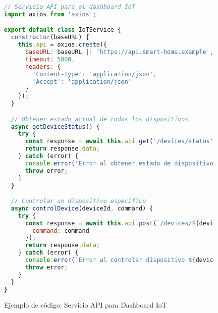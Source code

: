 
\newcommand{\CodeListing}[4]{
  \begin{figure}[H]
    \centering
    \begin{minipage}{0.95\textwidth}
      
    \end{minipage}
    \caption*{Listado de código: #2}
  \end{figure}
}

\begin{figure}[H]
  \centering
  \begin{minipage}{0.95\textwidth}
    \begin{lstlisting}[language=JavaScript, caption={Servicio de API para dashboard IoT}, label=lst:api-service]
// Servicio API para el dashboard IoT
import axios from 'axios';

export default class IoTService {
  constructor(baseURL) {
    this.api = axios.create({
      baseURL: baseURL || 'https://api.smart-home.example',
      timeout: 5000,
      headers: {
        'Content-Type': 'application/json',
        'Accept': 'application/json'
      }
    });
  }

  // Obtener estado actual de todos los dispositivos
  async getDeviceStatus() {
    try {
      const response = await this.api.get('/devices/status');
      return response.data;
    } catch (error) {
      console.error('Error al obtener estado de dispositivos:', error);
      throw error;
    }
  }

  // Controlar un dispositivo específico
  async controlDevice(deviceId, command) {
    try {
      const response = await this.api.post(`/devices/${deviceId}/control`, {
        command: command
      });
      return response.data;
    } catch (error) {
      console.error(`Error al controlar dispositivo ${deviceId}:`, error);
      throw error;
    }
  }
}
    \end{lstlisting}
  \end{minipage}
  \caption*{Ejemplo de código: Servicio API para Dashboard IoT}
\end{figure}

